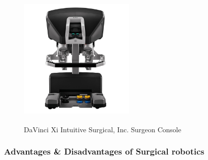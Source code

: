 \begin{center}
\begin{figure}[H]
\centering
\includegraphics[width=0.5\textwidth]{images/intuitive-davinci-console-front-lowres.jpg}\\
\caption[DaVinci Xi \textsuperscript {} Intuitive Surgical, Inc. Surgeon Console]{DaVinci Xi \textsuperscript {} Intuitive Surgical, Inc. Surgeon Console \footnotemark}
\end{figure}
\end{center}


\subsubsection{Advantages \& Disadvantages of Surgical robotics}

